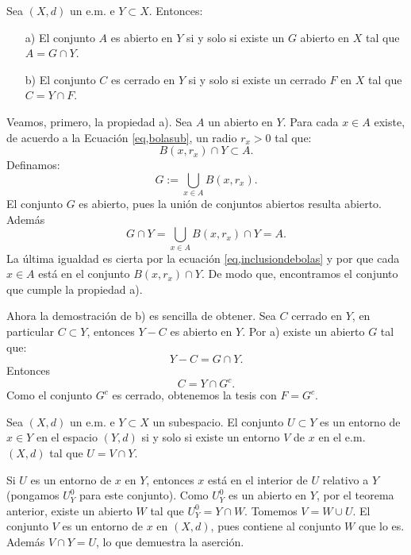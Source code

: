 \begin{teorema} Sea $(X,d)$ un e.m. e $Y\subset X$. Entonces:
\begin{itemize}
\item[a)] El conjunto $A$ es abierto en $Y$ si y solo si existe un
$G$ abierto en $X$ tal que $A=G\cap Y$.
\item[b)] El conjunto $C$ es cerrado en $Y$ si y solo si existe un
cerrado $F$ en $X$ tal que $C=Y\cap F$.
\end{itemize}
\end{teorema}
\begin{demo} Veamos, primero, la propiedad a). Sea $A$ un abierto
en $Y$. Para cada $x\in A$ existe, de acuerdo a la Ecuaci\'on
\vref{eq,bolasub}, un radio $r_x>0$ tal que:
\begin{equation}\label{eq,inclusiondebolas}
    B(x,r_x)\cap Y\subset A.
\end{equation}
Definamos:
\[
    G:=\bigcup\limits_{x\in A}B(x,r_x).
\]
El conjunto $G$ es abierto, pues la uni\'on de conjuntos abiertos
resulta abierto. Adem\'as
\[
    G\cap Y=\bigcup\limits_{x\in A}B(x,r_x)\cap Y= A.
\]
La \'ultima igualdad es cierta por la ecuaci\'on
\vref{eq,inclusiondebolas} y por que cada $x\in A$ est\'a en el
conjunto $B(x,r_x)\cap Y$. De modo que, encontramos el conjunto
que cumple la propiedad a).

Ahora la demostraci\'on de b) es sencilla de obtener. Sea $C$
cerrado en $Y$, en particular $C\subset Y$, entonces $Y-C$ es
abierto en $Y$. Por a) existe un abierto $G$ tal que:
\[
    Y-C=G\cap Y.
\]
Entonces
\[C=Y\cap G^c.\]
Como el conjunto $G^c$ es cerrado, obtenemos la tesis con $F=G^c$.
\end{demo}

\begin{proposicion}\label{pro,entornosub}Sea $(X,d)$ un e.m. e $Y\subset X$ un
subespacio. El conjunto $U\subset Y$ es un entorno de $x\in Y$ en
el espacio $(Y,d)$ si y solo si existe un entorno $V$ de $x$ en el
e.m. $(X,d)$ tal que $U=V\cap Y$.
\end{proposicion}
\begin{demo} Si $U$ es un entorno de $x$ en $Y$, entonces $x$
est\'a en el interior de $U$ relativo a $Y$ (pongamos $U^0_Y$ para
este conjunto). Como $U^0_Y$ es un abierto en $Y$, por el teorema
anterior, existe un abierto $W$ tal que $U^0_Y=Y\cap W$. Tomemos
$V=W\cup U$. El conjunto $V$ es un entorno de $x$ en $(X,d)$, pues
contiene al conjunto $W$ que lo es. Adem\'as $V\cap Y=U$, lo que
demuestra la aserci\'on.
\end{demo}

